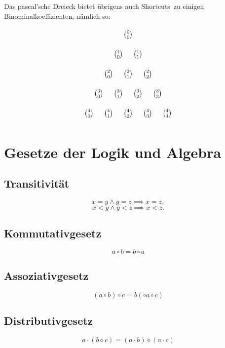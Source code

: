 \documentclass{scrartcl}
\begin{document}
Das pascal'sche Dreieck bietet übrigens auch \frq Shortcuts\flq\ zu einigen Binominalkoeffizienten, nämlich so:

\begin{center}
\begin{equation}
\begin{tikzpicture}
	\foreach \n in {0,...,4} {
		\foreach \k in {0,...,\n} {
			\node at (\k-\n/2,-\n) {$\binom{\n}{\k}$};
		}
	}
\end{tikzpicture}
\end{equation}
\end{center}

\section{Gesetze der Logik und Algebra}

\subsection{Transitivität}

\begin{equation}
	x = y \wedge y = z \implies x = z,
\end{equation}
\begin{equation}
	x < y \wedge y < z \implies x < z.
\end{equation}

\subsection{Kommutativgesetz}

\begin{equation}
	a \circ b = b \circ a
\end{equation}

\subsection{Assoziativgesetz}

\begin{equation}
	(a \circ b) \circ c = b (\circ a \circ c)
\end{equation}


\subsection{Distributivgesetz}

\begin{equation}
	a \cdot (b \diamond c) = (a \cdot b) \diamond (a \cdot c)
\end{equation}
\end{document}
